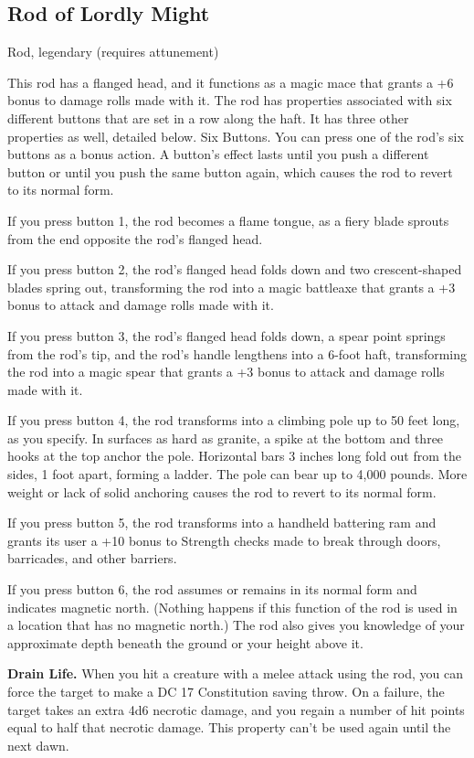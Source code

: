 \subsection{Rod of Lordly Might}
Rod, legendary (requires attunement) 

This rod has a flanged head, and it functions as a magic mace that grants a +6 bonus to damage rolls made with it. The rod has properties associated with six different buttons that are set in a row along the haft. It has three other properties as well, detailed below.
Six Buttons. You can press one of the rod's six buttons as a bonus action. A button's effect lasts until you push a different button or until you push the same button again, which causes the rod to revert to its normal form.  

If you press button 1, the rod becomes a flame tongue, as a fiery blade sprouts from the end opposite the rod's flanged head.  

If you press button 2, the rod's flanged head folds down and two crescent-shaped blades spring out, transforming the rod into a magic battleaxe that grants a +3 bonus to attack and damage rolls made with it.  

If you press button 3, the rod's flanged head folds down, a spear point springs from the rod's tip, and the rod's handle lengthens into a 6-foot haft, transforming the rod into a magic spear that grants a +3 bonus to attack and damage rolls made with it.

If you press button 4, the rod transforms into a climbing pole up to 50 feet long, as you specify. In surfaces as hard as granite, a spike at the bottom and three hooks at the top anchor the pole. Horizontal bars 3 inches long fold out from the sides, 1 foot apart, forming a ladder. The pole can bear up to 4,000 pounds. More weight or lack of solid anchoring causes the rod to revert to its normal form.

If you press button 5, the rod transforms into a handheld battering ram and grants its user a +10 bonus to Strength checks made to break through doors, barricades, and other barriers.

If you press button 6, the rod assumes or remains in its normal form and indicates magnetic north. (Nothing happens if this function of the rod is used in a location that has no magnetic north.) The rod also gives you knowledge of your approximate depth beneath the ground or your height above it.

\textbf{Drain Life.} When you hit a creature with a melee attack using the
rod, you can force the target to make a DC 17 Constitution saving throw. On a failure, the target takes an extra 4d6 necrotic damage, and you regain a number of hit points equal to half that necrotic damage. This property can't be used again until the next dawn.

